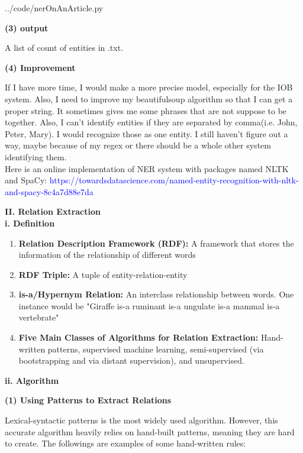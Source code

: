 \documentclass[a4paper,12pt]{report}
\begin{document}
\noindent
../code/nerOnAnArticle.py

\noindent
\textbf{(3) output}

\noindent
A list of count of entities in .txt.

\noindent
\textbf{(4) Improvement}

\noindent
If I have more time, I would make a more precise model, especially for the IOB system.  Also, I need to improve my beautifulsoup algorithm so that I can get a proper string. It sometimes gives me some phrases that are not suppose to be together. Also, I can't identify entities if they are separated by comma(i.e. John, Peter, Mary). I would recognize those as one entity. I still haven't figure out a way, maybe because of my regex or there should be a whole other system identifying them. \\

\noindent
Here is an online implementation of NER system with packages named NLTK and SpaCy: 
\textcolor{blue}{https://towardsdatascience.com/named-entity-recognition-with-nltk-and-spacy-8c4a7d88e7da}


\pagebreak
\noindent
\textbf{II. Relation Extraction}\\

\noindent
\textbf{i. Definition}
\begin{enumerate}
\item \textbf{Relation Description Framework (RDF): }A framework that stores the information of the relationship of different words
\item \textbf{RDF Triple: }A tuple of entity-relation-entity
\item \textbf{is-a/Hypernym Relation: }An interclass relationship between words. One instance would be "Giraffe is-a ruminant is-a ungulate is-a mammal is-a vertebrate"
\item \textbf{Five Main Classes of Algorithms for Relation Extraction: }Hand-written patterns, supervised machine learning, semi-supervised (via bootstrapping and via distant supervision), and unsupervised.
\end{enumerate}

\noindent
\textbf{ii. Algorithm}

\noindent
\textbf{(1) Using Patterns to Extract Relations}

\noindent
Lexical-syntactic patterns is the most widely used algorithm. However, this accurate algorithm heavily relies on hand-built patterns, meaning they are hard to create. The followings are examples of some hand-written rules:
\end{document}
